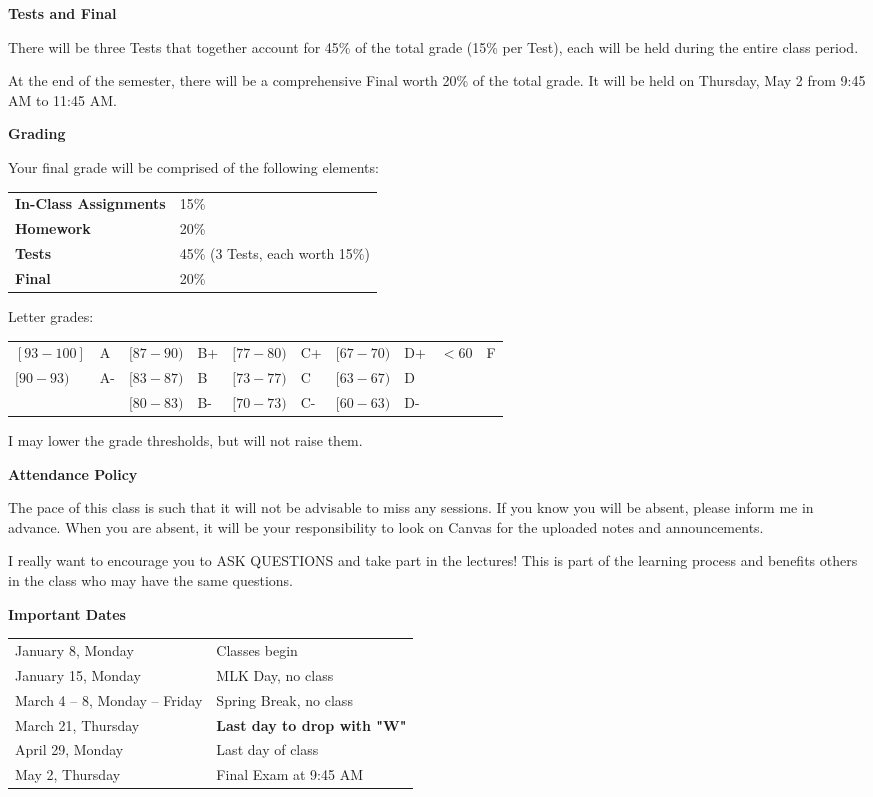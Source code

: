 \documentclass{article}
\begin{document}
\textbf{\large Tests and Final}\medskip

There will be three Tests that together account for 45\% of the total grade (15\% per Test), each will be held during the entire class period.

At the end of the semester, there will be a comprehensive Final worth 20\% of the total grade. It will be held on Thursday, May 2 from 9:45 AM to 11:45 AM.\bigskip

\textbf{\large Grading}\medskip

Your final grade will be comprised of the following elements:\bigskip\\
\begin{tabular}{ll}
    \textbf{In-Class Assignments} & 15\%\\
    \textbf{Homework} & 20\%\\
    \textbf{Tests} & 45\% (3 Tests, each worth 15\%)\\
    \textbf{Final} & 20\% 
\end{tabular}\medskip

Letter grades:\bigskip\\
\begin{tabular}{ll | ll | ll | ll | ll}
    \hline
    $[93 - 100]$ & A & $[87 - 90)$ & B+ & $[77 - 80)$ & C+ & $[67 - 70)$ & D+ & $< 60$ & F\\
    $[90 - 93)$ & A-  & $[83 - 87)$ & B & $[73 - 77)$ & C & $[63 - 67)$ & D & \\
     & & $[80 - 83)$ & B- & $[70 - 73)$ & C- & $[60 - 63)$ & D- & \\
    \hline
\end{tabular}

I may lower the grade thresholds, but will not raise them.\bigskip

\textbf{\large Attendance Policy}\medskip

The pace of this class is such that it will not be advisable to miss any sessions. If you know you will be absent, please inform me in advance. When you are absent, it will be your responsibility to look on Canvas for the uploaded notes and announcements.

I really want to encourage you to ASK QUESTIONS and take part in the lectures! This is part of the learning process and benefits others in the class who may have the same questions.\bigskip

\textbf{\large Important Dates}\medskip

\begin{tabular}{ll}
    January 8, Monday & Classes begin\\
    January 15, Monday & MLK Day, no class\\
    March 4 -- 8, Monday -- Friday & Spring Break, no class\\
    March 21, Thursday & \textbf{Last day to drop with "W"}\\
    April 29, Monday & Last day of class\\
    May 2, Thursday & Final Exam at 9:45 AM
\end{tabular}\bigskip
\end{document}
